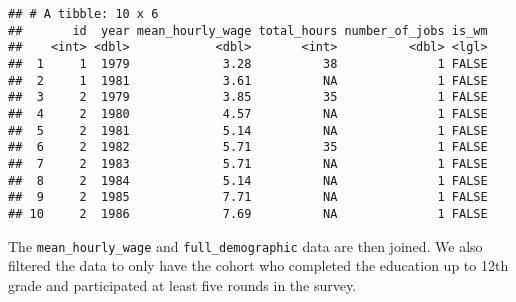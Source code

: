 \documentclass{article}
\newenvironment{Shaded}{\begin{snugshade}}{\end{snugshade}}
\newcommand{\CommentTok}[1]{\textcolor[rgb]{0.56,0.35,0.01}{\textit{#1}}}
\newcommand{\DataTypeTok}[1]{\textcolor[rgb]{0.13,0.29,0.53}{#1}}
\newcommand{\DecValTok}[1]{\textcolor[rgb]{0.00,0.00,0.81}{#1}}
\newcommand{\KeywordTok}[1]{\textcolor[rgb]{0.13,0.29,0.53}{\textbf{#1}}}
\newcommand{\NormalTok}[1]{#1}
\newcommand{\OperatorTok}[1]{\textcolor[rgb]{0.81,0.36,0.00}{\textbf{#1}}}
\newcommand{\StringTok}[1]{\textcolor[rgb]{0.31,0.60,0.02}{#1}}
\begin{document}
\begin{verbatim}
## # A tibble: 10 x 6
##       id  year mean_hourly_wage total_hours number_of_jobs is_wm
##    <int> <dbl>            <dbl>       <int>          <dbl> <lgl>
##  1     1  1979             3.28          38              1 FALSE
##  2     1  1981             3.61          NA              1 FALSE
##  3     2  1979             3.85          35              1 FALSE
##  4     2  1980             4.57          NA              1 FALSE
##  5     2  1981             5.14          NA              1 FALSE
##  6     2  1982             5.71          35              1 FALSE
##  7     2  1983             5.71          NA              1 FALSE
##  8     2  1984             5.14          NA              1 FALSE
##  9     2  1985             7.71          NA              1 FALSE
## 10     2  1986             7.69          NA              1 FALSE
\end{verbatim}

The \texttt{mean\_hourly\_wage} and \texttt{full\_demographic} data are
then joined. We also filtered the data to only have the cohort who
completed the education up to 12th grade and participated at least five
rounds in the survey.

\begin{Shaded}
\end{Shaded}
\end{document}
